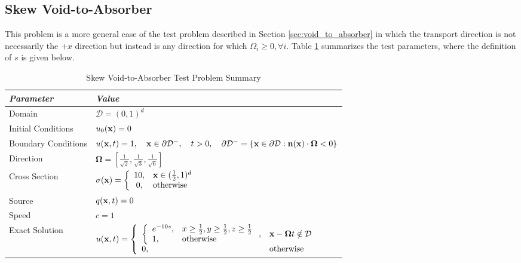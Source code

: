 \subsection{Skew Void-to-Absorber}\label{sec:skew_void_to_absorber}
This problem is a more general case of the test problem described in
Section \ref{sec:void_to_absorber} in which the transport direction is
not necessarily the $+x$ direction but instead is any direction for which
$\Omega_i\ge 0,\forall i$.
Table \ref{tab:void_to_absorber_skew} summarizes the test parameters,
where the definition of $s$ is given below.

\begin{table}[h]\caption{Skew Void-to-Absorber Test Problem Summary}
\label{tab:void_to_absorber_skew}
\centering
\begin{tabular}{l l}\toprule
\emph{Parameter} & \emph{Value}\\\midrule
Domain & $\mathcal{D} = (0,1)^d$\\
Initial Conditions & $u_0(\mathbf{x})=0$\\
Boundary Conditions & $u(\mathbf{x},t)=1,\quad \mathbf{x}\in\partial\mathcal{D}^-,\quad t>0,
   \quad\partial\mathcal{D}^-=\{\mathbf{x}\in\partial\mathcal{D}:\mathbf{n}(\mathbf{x})
   \cdot\mathbf{\Omega}<0\}$\\
Direction & $\mathbf{\Omega} = \left[\frac{1}{\sqrt{2}},\frac{1}{\sqrt{3}},
   \frac{1}{\sqrt{6}}\right]$\\
Cross Section & $\sigma(\mathbf{x})=\left\{\begin{array}{c l}
   10, & \mathbf{x}\in(\frac{1}{2},1)^d\\
   0,  & \mbox{otherwise}\end{array}\right.$\\
Source & $q(\mathbf{x},t)=0$\\
Speed & $c=1$\\
Exact Solution & $u(\mathbf{x},t)=\left\{\begin{array}{l l}
   \left\{\begin{array}{l l}
      e^{-10s}, & x\ge\frac{1}{2}, y\ge\frac{1}{2}, z\ge\frac{1}{2}\\
      1,        & \mbox{otherwise}
   \end{array}\right., & \mathbf{x}-\mathbf{\Omega}t\notin\mathcal{D}\\
   0, & \mbox{otherwise}
   \end{array}\right.$ \\
\bottomrule\end{tabular}
\end{table}

